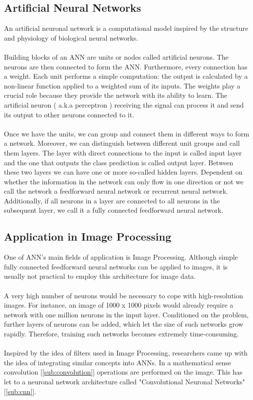 \documentclass[a4paper, 11pt, twoside, openright]{article}
\begin{document}
\subsection{Artificial Neural Networks} \label{sub:ann}

An artificial neuronal network is a computational model inspired by the structure and physiology of biological neural networks.
\\ \\
Building blocks of an ANN are units or nodes called artificial neurons. The neurons are then connected to form the ANN. Furthermore, every connection has a weight. Each unit performs a simple computation: the output is calculated by a non-linear function applied to a weighted sum of its inputs. The weights play a crucial role because they provide the network with its ability to learn. The artificial neuron ( a.k.a perceptron ) receiving the signal can process it and send its output to other neurons connected to it.\\ \\
Once we have the units, we can group and connect them in different ways to form a network. Moreover, we can distinguish between different unit groups and call them layers. The layer with direct connections to the input is called input layer and the one that outputs the class prediction is called output layer. Between these two layers we can have one or more so-called hidden layers. Dependent on whether the information in the network can only flow in one direction or not we call the network a feedforward neural network or recurrent neural network. Additionally, if all neurons in a layer are connected to all neurons in the subsequent layer, we call it a fully connected feedforward neural network.

\subsection{Application in Image Processing}

One of ANN's main fields of application is Image Processing. Although simple fully connected feedforward neural networks can be applied to images, it is usually not practical to employ this architecture for image data. \\ \\
A very high number of neurons would be necessary to cope with high-resolution images. For instance, an image of 1000 x 1000 pixels would already require a network with one million neurons in the input layer. Conditioned on the problem, further layers of neurons can be added, which let the size of such networks grow rapidly. Therefore, training such networks becomes extremely time-consuming. \\ \\
Inspired by the idea of filters used in Image Processing, researchers came up with the idea of integrating similar concepts into ANNs. In a mathematical sense convolution [\ref{sub:convolution}] operations are performed on the image. This has let to a neuronal network architecture called "Convolutional Neuronal Networks" [\ref{sub:cnn}].
\end{document}
